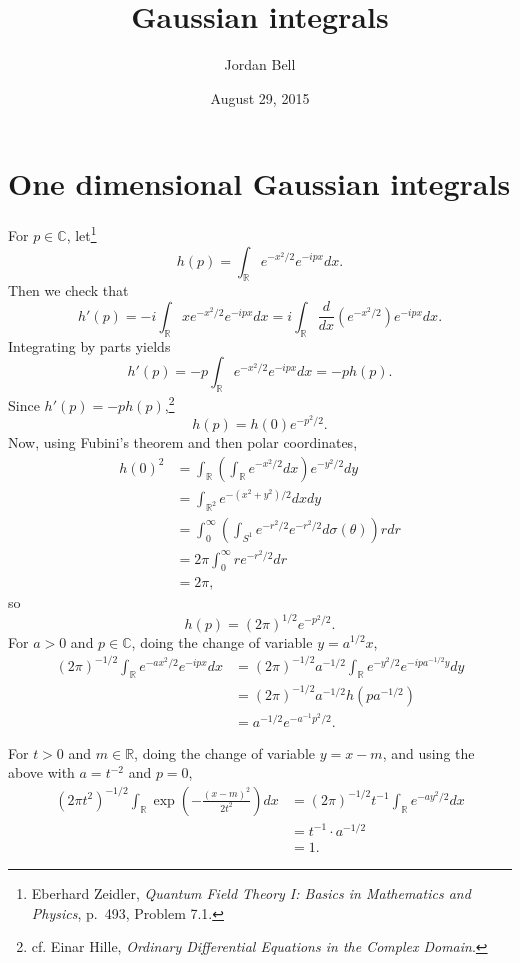 \documentclass{article}
\theoremstyle{definition}
\theoremstyle{definition}
\begin{document}
\title{Gaussian integrals}
\author{Jordan Bell}
\date{August 29, 2015}

\maketitle

\section{One dimensional Gaussian integrals}
For $p \in \mathbb{C}$, let\footnote{Eberhard Zeidler,
{\em Quantum Field Theory I: Basics in Mathematics and Physics},
p.~493, Problem 7.1.}
\[
h(p) = \int_{\mathbb{R}} e^{-x^2/2} e^{-ipx} dx.
\]
Then we check that
\[
h'(p) = -i \int_{\mathbb{R}} x e^{-x^2/2} e^{-ipx} dx = i\int_{\mathbb{R}} \frac{d}{dx} \left( e^{-x^2/2} \right)
e^{-ipx} dx.
\]
Integrating by parts yields
\[
h'(p) = -p \int_{\mathbb{R}} e^{-x^2/2} e^{-ipx} dx = -p h(p).
\]
Since $h'(p)=-p h(p)$,\footnote{cf. Einar Hille, {\em Ordinary Differential Equations in the Complex Domain}.}
\[
h(p) = h(0) e^{-p^2/2}.
\]
Now, using Fubini's theorem and then polar coordinates,
\begin{align*}
h(0)^2 &= \int_{\mathbb{R}} \left( \int_{\mathbb{R}} e^{-x^2/2} dx\right) e^{-y^2/2} dy\\
&=\int_{\mathbb{R}^2} e^{-(x^2+y^2)/2} dxdy\\
&=\int_0^\infty \left( \int_{S^1} e^{-r^2/2} e^{-r^2/2} d\sigma(\theta) \right) r dr\\
&=2\pi \int_0^\infty r e^{-r^2/2} dr\\
&=2\pi,
\end{align*}
so
\[
h(p) = (2\pi)^{1/2} e^{-p^2/2}.
\]
For $a>0$ and $p \in \mathbb{C}$, doing the change of variable $y = a^{1/2} x$,
\begin{align*}
(2\pi)^{-1/2} \int_{\mathbb{R}} e^{-ax^2/2} e^{-ipx} dx&=(2\pi)^{-1/2} a^{-1/2} \int_{\mathbb{R}} e^{-y^2/2} e^{-ipa^{-1/2} y} dy\\
&=(2\pi)^{-1/2} a^{-1/2} h(pa^{-1/2})\\
&=a^{-1/2} e^{-a^{-1} p^2 /2}.
\end{align*}

For $t>0$ and $m \in \mathbb{R}$, doing the change of variable $y=x-m$, and using the above with $a=t^{-2}$ and $p=0$,
\begin{align*}
(2\pi t^2)^{-1/2} \int_{\mathbb{R}} \exp\left(-\frac{(x-m)^2}{2t^2}\right) dx&=(2\pi)^{-1/2}  t^{-1} \int_{\mathbb{R}} e^{-ay^2/2} dx\\
&=t^{-1} \cdot a^{-1/2}\\
&=1.
\end{align*}
\end{document}
